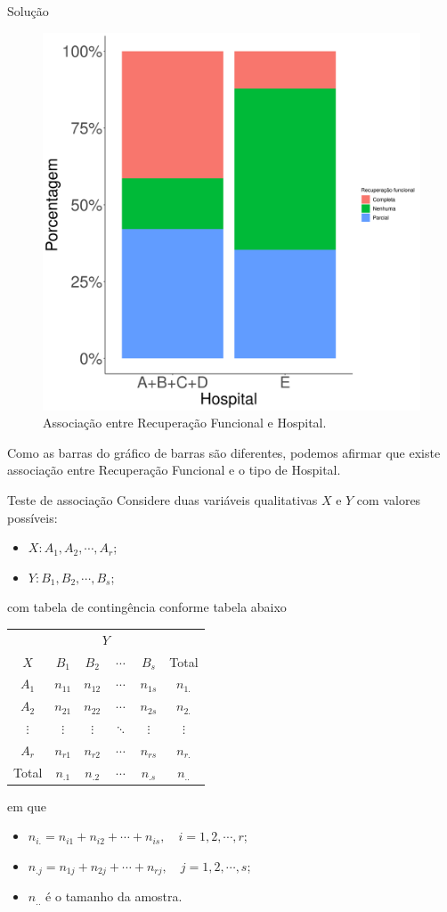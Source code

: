 \documentclass[9pt]{beamer}
\begin{document}
\begin{frame}{Solução}

\begin{figure}[htbp]
	\centering
	\caption{Associação entre Recuperação Funcional e Hospital.}
	\includegraphics[width = 0.5\linewidth]{figures/associacao_moderada.png}
\end{figure}

Como as barras do gráfico de barras são diferentes, podemos afirmar que existe associação entre Recuperação Funcional e o tipo de Hospital.
\end{frame}

\begin{frame}{Teste de associação}
Considere duas variáveis qualitativas $X$ e $Y$ com valores possíveis:
\begin{itemize}
	\item $X: A_1, A_2, \cdots, A_r$;
	\item $Y: B_1, B_2, \cdots, B_s$;
\end{itemize}
com tabela de contingência conforme tabela abaixo
\begin{table}[htbp]
	\centering
	\begin{tabular}{c|cccc|c}
		\toprule[0.05cm]
		& \multicolumn{4}{|c|}{$Y$} & \\ \cmidrule[0.05cm]{2-5}
		$X$ & $B_1$ & $B_2$ & $\cdots$ & $B_s$ & Total\\ \midrule[0.05cm]
		$A_1$ & $n_{11}$ & $n_{12}$ & $\cdots$ & $n_{1s}$ & $n_{1.}$\\
		$A_2$ & $n_{21}$ & $n_{22}$ & $\cdots$ & $n_{2s}$ & $n_{2.}$\\
		$\vdots$ & $\vdots$ & $\vdots$ & $\ddots$ & $\vdots$ & $\vdots$\\
		$A_r$ & $n_{r1}$ & $n_{r2}$ & $\cdots$ & $n_{rs}$ & $n_{r.} $\\ \midrule[0.05cm]
		Total & $n_{.1}$ & $n_{.2}$ & $\cdots$ & $n_{.s}$ & $n_{..}$\\
		\bottomrule[0.05cm]
	\end{tabular}
\end{table}
em que 
\begin{itemize}
	\item $n_{i.} = n_{i1}+n_{i2}+\cdots+n_{is}, \quad i =1,2, \cdots, r$;
	\item $n_{.j} = n_{1j}+n_{2j}+\cdots+n_{rj}, \quad j =1,2, \cdots, s$;
	\item $n_{..}$ é o tamanho da amostra.
\end{itemize}

\end{frame}
\end{document}
